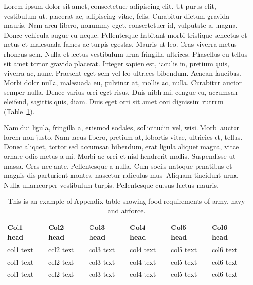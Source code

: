 \documentclass[APA,Times1COL]{WileyNJDv5} %
\begin{document}

Lorem ipsum dolor sit amet, consectetuer adipiscing elit. Ut purus elit, vestibulum ut, placerat ac, adipiscing vitae,
felis. Curabitur dictum gravida mauris. Nam arcu libero, nonummy eget, consectetuer id, vulputate a, magna. Donec
vehicula augue eu neque. Pellentesque habitant morbi tristique senectus et netus et malesuada fames ac turpis egestas.
Mauris ut leo. Cras viverra metus rhoncus sem. Nulla et lectus vestibulum urna fringilla ultrices. Phasellus eu tellus
sit amet tortor gravida placerat. Integer sapien est, iaculis in, pretium quis, viverra ac, nunc. Praesent eget sem vel
leo ultrices bibendum. Aenean faucibus. Morbi dolor nulla, malesuada eu, pulvinar at, mollis ac, nulla. Curabitur
auctor semper nulla. Donec varius orci eget risus. Duis nibh mi, congue eu, accumsan eleifend, sagittis quis, diam.
Duis eget orci sit amet orci dignissim rutrum (Table~\ref{tab4}).

Nam dui ligula, fringilla a, euismod sodales, sollicitudin vel, wisi. Morbi auctor lorem non justo. Nam lacus libero,
pretium at, lobortis vitae, ultricies et, tellus. Donec aliquet, tortor sed accumsan bibendum, erat ligula aliquet magna,
vitae ornare odio metus a mi. Morbi ac orci et nisl hendrerit mollis. Suspendisse ut massa. Cras nec ante. Pellentesque
a nulla. Cum sociis natoque penatibus et magnis dis parturient montes, nascetur ridiculus mus. Aliquam tincidunt
urna. Nulla ullamcorper vestibulum turpis. Pellentesque cursus luctus mauris.

\begin{table}[t]%
\centering
\caption{This is an example of Appendix table showing food requirements of army, navy and airforce.\label{tab4}}%
\begin{tabular*}{\textwidth}{@{\extracolsep\fill}llllll@{\extracolsep\fill}}%
\toprule
\textbf{Col1 head} & \textbf{Col2 head} & \textbf{Col3 head} & \textbf{Col4 head} & \textbf{Col5 head} & \textbf{Col6 head} \\
\midrule
col1 text & col2 text & col3 text & col4 text & col5 text & col6 text\\
col1 text & col2 text & col3 text & col4 text & col5 text & col6 text\\
col1 text & col2 text & col3 text& col4 text & col5 text & col6 text\\
\bottomrule
\end{tabular*}
\end{table}
\end{document}
